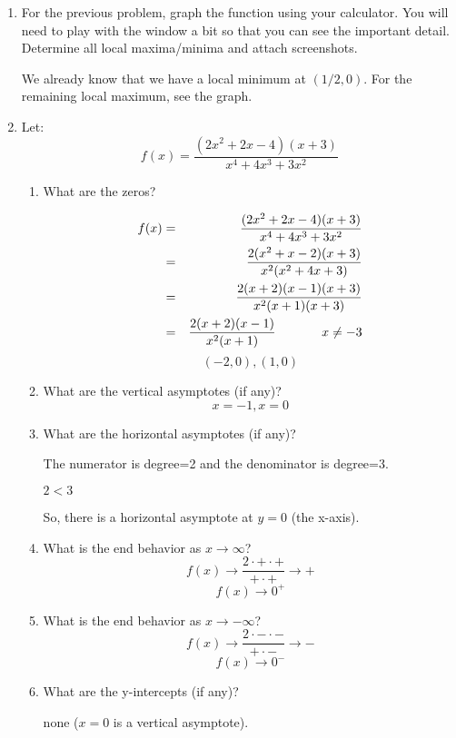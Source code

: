 \documentclass[letterpaper,12pt,fleqn]{article}
\begin{document}
\begin{enumerate}
\item For the previous problem, graph the function using your calculator. You
will need to play with the window a bit so that you can see the important
detail. Determine all local maxima/minima and attach screenshots.

We already know that we have a local minimum at $(1/2,0)$. For the remaining
local maximum, see the graph.

\item Let:
\[f(x)=\frac{(2x^2+2x-4)(x+3)}{x^4+4x^3+3x^2}\]
\begin{enumerate}
\item What are the zeros?

\begin{eqnarray*}
f(x) &=& \frac{(2x^2+2x-4)(x+3)}{x^4+4x^3+3x^2} \\
     &=& \frac{2(x^2+x-2)(x+3)}{x^2(x^2+4x+3)} \\
     &=& \frac{2(x+2)(x-1)(x+3)}{x^2(x+1)(x+3)} \\
     &=& \frac{2(x+2)(x-1)}{x^2(x+1)}\hspace{0.5in}x\ne-3 \\
\end{eqnarray*}
\[(-2,0), (1,0)\]

\item What are the vertical asymptotes (if any)?
\[x=-1, x=0\]

\item What are the horizontal asymptotes (if any)?

\bigskip

The numerator is degree=2 and the denominator is degree=3.

$2<3$

So, there is a horizontal asymptote at $y=0$ (the x-axis).

\bigskip

\item What is the end behavior as $x\to\infty$?
\[f(x)\to\frac{2\cdot+\cdot+}{+\cdot+}\to+\]
\[f(x)\to0^+\]

\item What is the end behavior as $x\to-\infty$?
\[f(x)\to\frac{2\cdot-\cdot-}{+\cdot-}\to-\]
\[f(x)\to0^-\]

\item What are the y-intercepts (if any)?

\bigskip

none ($x=0$ is a vertical asymptote).

\bigskip


\end{enumerate}
\end{enumerate}
\end{document}
